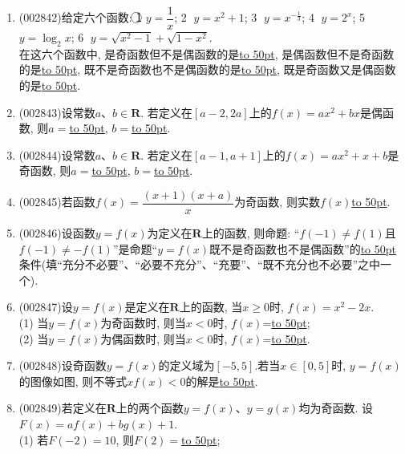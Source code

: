 \documentclass[10pt,a4paper]{article}
\newcommand{\blank}[1]{\underline{\hbox to #1pt{}}}
\begin{document}
\begin{enumerate}[1.]
\item {\tiny (002842)}给定六个函数: \textcircled{1} $y=\dfrac 1x$; \textcircled{2} $y=x^2+1$; \textcircled{3} $y={x^{-\frac 13}}$; \textcircled{4} $y=2^x$; \textcircled{5} $y=\log_2x$; \textcircled{6} $y=\sqrt{x^2-1}+\sqrt{1-x^2}$.\\
在这六个函数中, 是奇函数但不是偶函数的是\blank{50}, 是偶函数但不是奇函数的是\blank{50}, 既不是奇函数也不是偶函数的是\blank{50}, 既是奇函数又是偶函数的是\blank{50}.
\item {\tiny (002843)}设常数$a$、$b\in \mathbf{R}$. 若定义在$[a-2,2a]$上的$f(x)=ax^2+bx$是偶函数, 则$a=$\blank{50}, $b=$\blank{50}.
\item {\tiny (002844)}设常数$a$、$b\in \mathbf{R}$. 若定义在$[a-1,a+1]$上的$f(x)=ax^2+x+b$是奇函数, 则$a=$\blank{50}, $b=$\blank{50}.
\item {\tiny (002845)}若函数$f(x)=\dfrac{(x+1)(x+a)}x$为奇函数, 则实数$f(x)$\blank{50}.
\item {\tiny (002846)}设函数$y=f(x)$为定义在$\mathbf{R}$上的函数, 则命题: ``$f(-1)\ne f(1)$且$f(-1)\ne -f(1)$''是命题``$y=f(x)$既不是奇函数也不是偶函数''的\blank{50}条件(填``充分不必要''、``必要不充分''、``充要''、``既不充分也不必要''之中一个).
\item {\tiny (002847)}设$y=f(x)$是定义在$\mathbf{R}$上的函数, 当$x\ge 0$时, $f(x)=x^2-2x$.\\
(1) 当$y=f(x)$为奇函数时, 则当$x<0$时, $f(x)$=\blank{50};\\
(2) 当$y=f(x)$为偶函数时, 则当$x<0$时, $f(x)$=\blank{50}.
\item {\tiny (002848)}设奇函数$y=f(x)$的定义域为$[-5, 5]$.若当$x\in [0,5]$时, $y=f(x)$的图像如图, 则不等式$xf(x)<0$的解是\blank{50}.
\begin{center}
\end{center}
\item {\tiny (002849)}若定义在$\mathbf{R}$上的两个函数$y=f(x)$、$y=g(x)$均为奇函数. 设$F(x)=af(x)+bg(x)+1$.\\
(1) 若$F(-2)=10$, 则$F(2)=$\blank{50};\\

\end{enumerate}
\end{document}
